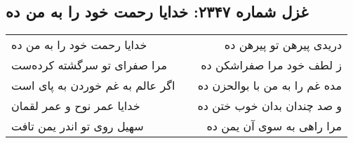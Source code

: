 \begin{center}
\section*{غزل شماره ۲۳۴۷: خدایا رحمت خود را به من ده}
\label{sec:2347}
\begin{longtable}{l p{0.5cm} r}
خدایا رحمت خود را به من ده
&&
دریدی پیرهن تو پیرهن ده
\\
مرا صفرای تو سرگشته کرده‌ست
&&
ز لطف خود مرا صفراشکن ده
\\
اگر عالم به غم خوردن به پای است
&&
مده غم را به من با بوالحزن ده
\\
خدایا عمر نوح و عمر لقمان
&&
و صد چندان بدان خوب ختن ده
\\
سهیل روی تو اندر یمن تافت
&&
مرا راهی به سوی آن یمن ده
\\
\end{longtable}
\end{center}
